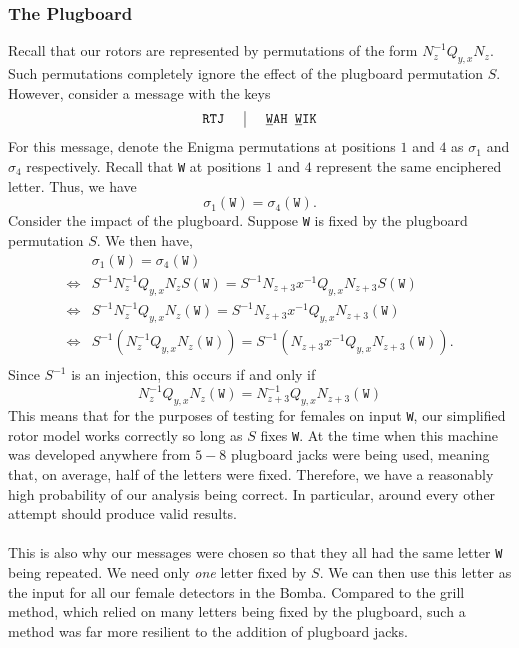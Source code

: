 \subsubsection{The Plugboard}
Recall that our rotors are represented by permutations of the form
$N_{z}^{-1}Q_{y,x}N_{z}$. Such permutations completely ignore the
effect of the plugboard permutation $S$. However, consider a message
with the keys
\[
  \setlength{\arraycolsep}{15pt}
  \begin{array}{c | c}
    \texttt{RTJ} & {\uline{\texttt{W}}}\texttt{AH
    }{\uline{\texttt{W}}}\texttt{IK}              \\
  \end{array}
\]
For this message, denote the Enigma permutations at positions $1$ and $4$ as $\sigma_1$ and $\sigma_4$ respectively. Recall that \texttt{W}
at positions $1$ and $4$ represent the same enciphered letter. Thus, we have
\[
  \sigma_1(\texttt{W}) = \sigma_4(\texttt{W}).
  \]
Consider the impact of the plugboard. Suppose \texttt{W} is fixed by the plugboard permutation $S$. We then have,
\begin{align*}
  & \sigma_1(\texttt{W}) = \sigma_4(\texttt{W})
  \\
  \iff & S^{-1}N_z^{-1}Q_{y,x}N_zS(\texttt{W}) =
  S^{-1}N_{z+3}x^{-1}Q_{y,x}N_{z+3}S(\texttt{W})     \\
  \iff & S^{-1}N_z^{-1}Q_{y,x}N_z(\texttt{W}) =
  S^{-1}N_{z+3}x^{-1}Q_{y,x}N_{z+3}(\texttt{W})      \\
  \iff & S^{-1}(N_z^{-1}Q_{y,x}N_z(\texttt{W})) =
  S^{-1}(N_{z+3}x^{-1}Q_{y,x}N_{z+3}(\texttt{W})).    \\
\end{align*}
Since $S^{-1}$ is an injection, this occurs if and only if
\[
  N_z^{-1}Q_{y,x}N_z(\texttt{W}) = N_{z+3}^{-1}Q_{y,x}N_{z+3}(\texttt{W})
\]
This means that for the purposes of testing for females on input
\texttt{W}, our simplified rotor model works correctly so long as $S$
fixes \texttt{W}. At the time when this machine was developed
anywhere from $5-8$ plugboard jacks were being used, meaning that, on
average, half of the letters were fixed. Therefore, we have a
reasonably high probability of our analysis being correct. In particular, around every other attempt should produce valid results. 
\\\\This is also why our messages were chosen so that
they all had the same letter \texttt{W} being repeated. We need only \emph{one} letter fixed by $S$. We can then use this letter as the input for all our female detectors in the Bomba. Compared to the grill method, which relied on many letters being fixed by the plugboard, such a method was far more resilient to the addition of plugboard jacks. 

